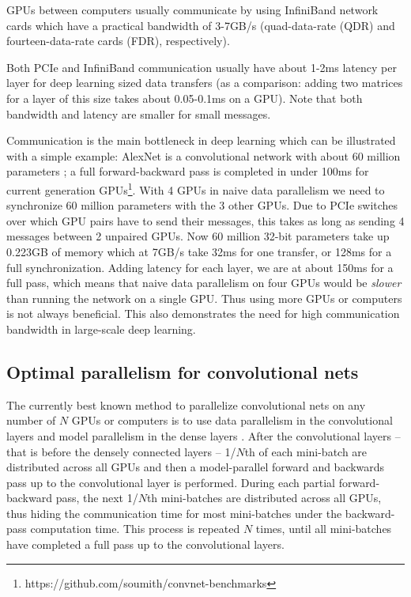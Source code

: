 \documentclass{article} %
\begin{document}
GPUs between computers usually communicate by using InfiniBand network cards which have a practical bandwidth of 3-7GB/s (quad-data-rate (QDR) and fourteen-data-rate cards (FDR), respectively).

Both PCIe and InfiniBand communication usually have about 1-2ms latency per layer for deep learning sized data transfers (as a comparison: adding two matrices for a layer of this size takes about 0.05-0.1ms on a GPU). Note that both bandwidth and latency are smaller for small messages. 

Communication is the main bottleneck in deep learning which can be illustrated with a simple example: AlexNet is a convolutional network with about 60 million parameters \citep{krizhevsky2012imagenet}; a full forward-backward pass is completed in under 100ms for current generation GPUs\footnote{https://github.com/soumith/convnet-benchmarks}. With 4 GPUs in naive data parallelism we need to synchronize 60 million parameters with the 3 other GPUs. Due to PCIe switches over which GPU pairs have to send their messages, this takes as long as sending 4 messages between 2 unpaired GPUs. Now 60 million 32-bit parameters take up 0.223GB of memory which at 7GB/s take 32ms for one transfer, or 128ms for a full synchronization. Adding latency for each layer, we are at about 150ms for a full pass, which means that naive data parallelism on four GPUs would be {\it slower} than running the network on a single GPU. Thus using more GPUs or computers is not always beneficial. This also demonstrates the need for high communication bandwidth in large-scale deep learning.


\subsection{Optimal parallelism for convolutional nets}

The currently best known method to parallelize convolutional nets on any number of $N$ GPUs or computers is to use data parallelism in the convolutional layers and model parallelism in the dense layers \citep{krizhevsky2014one}. After the convolutional layers -- that is before the densely connected layers -- 1/$N$th of each mini-batch are distributed across all GPUs and then a model-parallel forward and backwards pass up to the convolutional layer is performed. During each partial forward-backward pass, the next 1/$N$th mini-batches are distributed across all GPUs, thus hiding the communication time for most mini-batches under the backward-pass computation time. This process is repeated $N$ times, until all mini-batches have completed a full pass up to the convolutional layers. 
\end{document}
